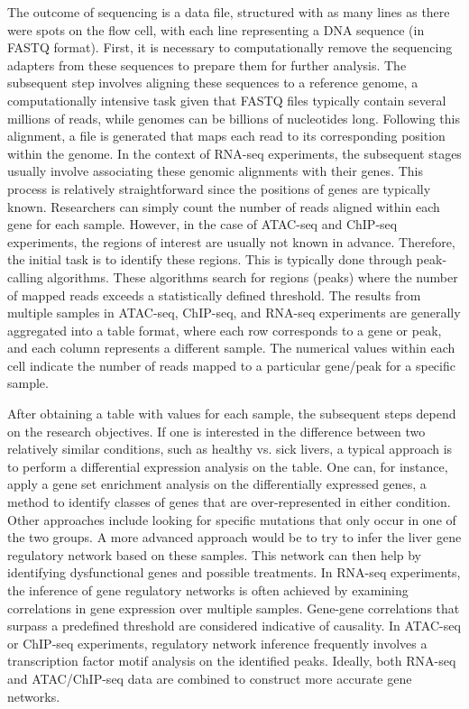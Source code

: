 The outcome of sequencing is a data file, structured with as many lines as there were spots on the flow cell, with each line representing a DNA sequence (in FASTQ format). First, it is necessary to computationally remove the sequencing adapters from these sequences to prepare them for further analysis. The subsequent step involves aligning these sequences to a reference genome, a computationally intensive task given that FASTQ files typically contain several millions of reads, while genomes can be billions of nucleotides long. Following this alignment, a file is generated that maps each read to its corresponding position within the genome. In the context of RNA-seq experiments, the subsequent stages usually involve associating these genomic alignments with their genes. This process is relatively straightforward since the positions of genes are typically known. Researchers can simply count the number of reads aligned within each gene for each sample. However, in the case of ATAC-seq and ChIP-seq experiments, the regions of interest are usually not known in advance. Therefore, the initial task is to identify these regions. This is typically done through peak-calling algorithms\cite{Zhang2008,Stovner2019,Tarbell2019}. These algorithms search for regions (peaks) where the number of mapped reads exceeds a statistically defined threshold. The results from multiple samples in ATAC-seq, ChIP-seq, and RNA-seq experiments are generally aggregated into a table format, where each row corresponds to a gene or peak, and each column represents a different sample. The numerical values within each cell indicate the number of reads mapped to a particular gene/peak for a specific sample.

After obtaining a table with values for each sample, the subsequent steps depend on the research objectives. If one is interested in the difference between two relatively similar conditions, such as healthy vs. sick livers, a typical approach is to perform a differential expression analysis on the table\cite{deseq2}.  One can, for instance, apply a gene set enrichment analysis on the differentially expressed genes, a method to identify classes of genes that are over-represented in either condition. Other approaches include looking for specific mutations that only occur in one of the two groups. A more advanced approach would be to try to infer the liver gene regulatory network based on these samples. This network can then help by identifying dysfunctional genes and possible treatments. In RNA-seq experiments, the inference of gene regulatory networks is often achieved by examining correlations in gene expression over multiple samples. Gene-gene correlations that surpass a predefined threshold are considered indicative of causality. In ATAC-seq or ChIP-seq experiments, regulatory network inference frequently involves a transcription factor motif analysis on the identified peaks. Ideally, both RNA-seq and ATAC/ChIP-seq data are combined to construct more accurate gene networks.


